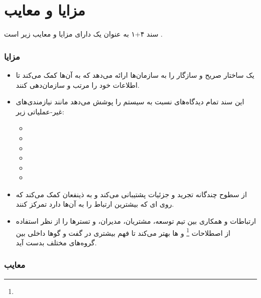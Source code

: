 \documentclass[a4paper]{article}
\begin{document}
\section*{مزایا و معایب}

سند ۴+۱ به عنوان یک  دارای مزایا و معایب زیر است \cite{linkedin}.

\subsubsection*{مزایا}

\begin{itemize}
    \item یک ساختار صریح و سازگار را به سازمان‌ها ارائه می‌دهد که به آن‌ها کمک
    می‌کند تا اطلاعات خود را مرتب و سازمان‌دهی کنند.
    \item این سند تمام دیدگاه‌های نسبت به سیستم را پوشش می‌دهد مانند
    نیازمندی‌های غیر-عملیاتی زیر:
    \begin{itemize}
        \item {}
        \item {}
        \item {}
        \item {}
        \item {}
        \item {}
    \end{itemize}
    \item از سطوح چندگانه تجرید و جزئیات پشتیبانی می‌کند و به ذینفعان کمک می‌کند
    که روی ای‌ که بیشترین ارتباط را به آن‌ها دارد تمرکز کنند.
    \item ارتباطات و همکاری بین تیم توسعه، مشتریان، مدیران، و تستر‌ها را از نظر
    استفاده از اصطلاحات \footnote{} و ها بهتر
    می‌کند تا فهم بیشتری در گفت و گو‌ها داخلی بین گروه‌های مختلف بدست آید.
\end{itemize}

\subsubsection*{معایب}
\end{document}
